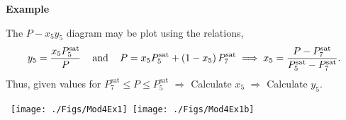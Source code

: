 \begin{MyExample}{\begin{center}{\bf Example}\end{center}}
           The $P-x_{5}y_{5}$ diagram may be plot using the relations,
           \begin{displaymath}
               y_{5} = \displaystyle\frac{x_{5}P_{5}^{\text{sat}}}{P}\;\;\;\text{ and }\;\;\; P = x_{5}P_{5}^{\text{sat}} + \left(1-x_{5}\right)P_{7}^{\text{sat}} \;\Longrightarrow\; x_{5} = \displaystyle\frac{P-P_{7}^{\text{sat}}}{P_{5}^{\text{sat}}-P_{7}^{\text{sat}}}.
           \end{displaymath}
           Thus, given values for $P_{7}^{\text{sat}}\leq P \leq P_{5}^{\text{sat}}$ $\Rightarrow$ Calculate $x_{5}$  $\Rightarrow$ Calculate $y_{5}$.
           \bigskip
           
           \hbox{
             \texttt{[image: ./Figs/Mod4Ex1]}
             \texttt{[image: ./Figs/Mod4Ex1b]}}
           
   \end{MyExample} 

